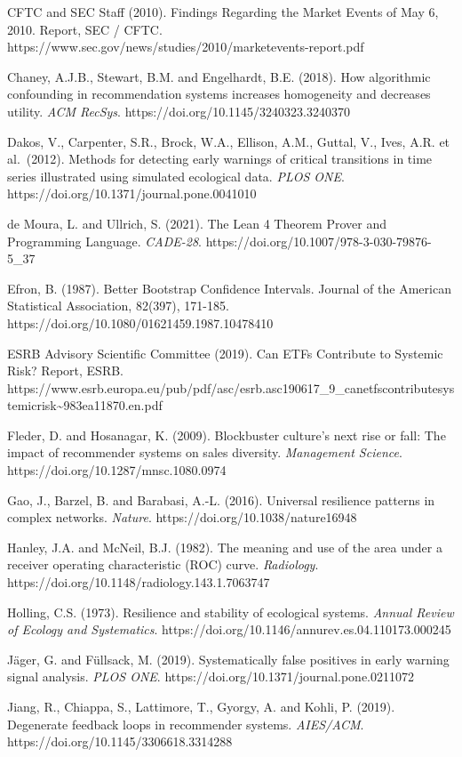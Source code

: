 \documentclass[
  11pt,
]{article}
\begin{document}
CFTC and SEC Staff (2010). Findings Regarding the Market Events of May
6, 2010. Report, SEC / CFTC.
https://www.sec.gov/news/studies/2010/marketevents-report.pdf

Chaney, A.J.B., Stewart, B.M. and Engelhardt, B.E. (2018). How
algorithmic confounding in recommendation systems increases homogeneity
and decreases utility. \emph{ACM RecSys}.
https://doi.org/10.1145/3240323.3240370

Dakos, V., Carpenter, S.R., Brock, W.A., Ellison, A.M., Guttal, V.,
Ives, A.R. et al.~(2012). Methods for detecting early warnings of
critical transitions in time series illustrated using simulated
ecological data. \emph{PLOS ONE}.
https://doi.org/10.1371/journal.pone.0041010

de Moura, L. and Ullrich, S. (2021). The Lean 4 Theorem Prover and
Programming Language. \emph{CADE-28}.
https://doi.org/10.1007/978-3-030-79876-5\_37

Efron, B. (1987). Better Bootstrap Confidence Intervals. Journal of the
American Statistical Association, 82(397), 171-185.
https://doi.org/10.1080/01621459.1987.10478410

ESRB Advisory Scientific Committee (2019). Can ETFs Contribute to
Systemic Risk? Report, ESRB.
https://www.esrb.europa.eu/pub/pdf/asc/esrb.asc190617\_9\_canetfscontributesystemicrisk\textasciitilde983ea11870.en.pdf

Fleder, D. and Hosanagar, K. (2009). Blockbuster culture's next rise or
fall: The impact of recommender systems on sales diversity.
\emph{Management Science}. https://doi.org/10.1287/mnsc.1080.0974

Gao, J., Barzel, B. and Barabasi, A.-L. (2016). Universal resilience
patterns in complex networks. \emph{Nature}.
https://doi.org/10.1038/nature16948

Hanley, J.A. and McNeil, B.J. (1982). The meaning and use of the area
under a receiver operating characteristic (ROC) curve. \emph{Radiology}.
https://doi.org/10.1148/radiology.143.1.7063747

Holling, C.S. (1973). Resilience and stability of ecological systems.
\emph{Annual Review of Ecology and Systematics}.
https://doi.org/10.1146/annurev.es.04.110173.000245

Jäger, G. and Füllsack, M. (2019). Systematically false positives in
early warning signal analysis. \emph{PLOS ONE}.
https://doi.org/10.1371/journal.pone.0211072

Jiang, R., Chiappa, S., Lattimore, T., Gyorgy, A. and Kohli, P. (2019).
Degenerate feedback loops in recommender systems. \emph{AIES/ACM}.
https://doi.org/10.1145/3306618.3314288
\end{document}
